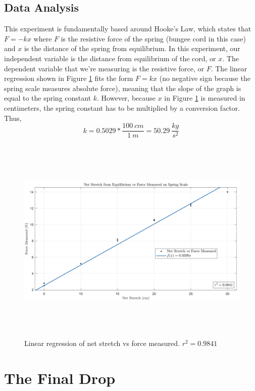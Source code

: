 \documentclass[12pt]{article}
\begin{document}
\subsection{Data Analysis}
This experiment is fundamentally based around Hooke's Law, which states that $F=-kx$ where $F$ is the resistive force of the spring (bungee cord in this case) and $x$ is the distance of the spring from equilibrium. In this experiment, our independent variable is the distance from equilibrium of the cord, or $x$. The dependent variable that we're measuring is the resistive force, or $F$. The linear regression shown in Figure \ref{fig:springStretchVsForce} fits the form $F=kx$ (no negative sign because the spring scale measures absolute force), meaning that the slope of the graph is equal to the spring constant $k$. However, because $x$ in Figure \ref{fig:springStretchVsForce} is measured in centimeters, the spring constant has to be multiplied by a conversion factor. Thus, $$k=0.5029*\frac{100\ cm}{1\ m}=50.29\ \frac{kg}{s^2}$$

\begin{figure}[h]
    \centering
    \includegraphics[height=10cm]{stretchVsForce}
    \caption{Linear regression of net stretch vs force measured. $r^2 = 0.9841$}
    \label{fig:springStretchVsForce}
\end{figure}
\newpage

\section{The Final Drop}
\end{document}
